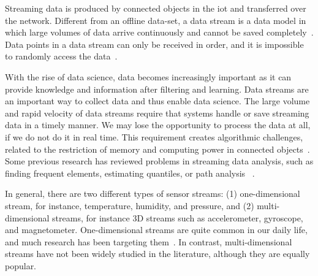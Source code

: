Streaming data is produced by connected objects in the \acrshort{iot} and
transferred over the network. Different from an offline data-set, a data stream
is a data model in which large volumes of data arrive continuously and cannot be
saved completely~\cite{o2002streaming}. Data points in a data stream can
only be received in order, and it is impossible to randomly access the
data~\cite{o2002streaming}.

With the rise of data science, data becomes increasingly important as it can
provide knowledge and information after filtering and learning. Data streams
are an important way to collect data and thus enable data science. The large volume and
rapid velocity of data streams require that systems handle or save streaming data
in a timely manner. We may lose the opportunity to process the data at all, if we do not do
it in real time. This requirement creates algorithmic challenges, related to the restriction
of memory and computing power in connected objects~\cite{o2002streaming}. Some
previous research has reviewed problems in streaming data analysis, such as
finding frequent elements, estimating quantiles, or path
analysis~\cite{kejariwal2015real} .

In general, there are two different types of sensor streams: (1) one-dimensional
stream, for instance, temperature, humidity, and pressure, and (2) multi-dimensional
streams, for instance 3D streams such as accelerometer, gyroscope, and magnetometer. One-dimensional 
streams are quite common in our daily life, and much research has been targeting 
them~\cite{kulwicki1991humidity, oprea2009temperature, woyessa2016temperature}.
In contrast, multi-dimensional streams have not been
widely studied in the literature, although they are equally popular.





